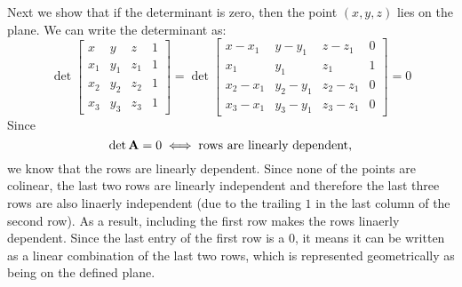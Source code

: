 \begin{sol}
    Next we show that if the determinant is zero, then the point $(x,y,z)$ lies on the plane. We can write the determinant as:
    \begin{equation}
        \det \begin{bmatrix}
            x & y & z & 1 \\ 
            x_1 & y_1 & z_1 & 1 \\ 
            x_2 & y_2 & z_2 & 1 \\ 
            x_3 & y_3 & z_3 & 1 
        \end{bmatrix}
        = 
        \det \begin{bmatrix}
            x-x_1 & y-y_1 & z-z_1 & 0 \\ 
            x_1 & y_1 & z_1 & 1 \\ 
            x_2-x_1 & y_2-y_1 & z_2-z_1 & 0 \\ 
            x_3-x_1 & y_3-y_1 & z_3-z_1 & 0
        \end{bmatrix} = 0
    \end{equation}
    Since $$\det \mathbf{A} = 0 \iff \text{rows are linearly dependent},$$ we know that the rows are linearly dependent. Since none of the points are colinear, the last two rows are linearly independent and therefore the last three rows are also linaerly independent (due to the trailing $1$ in the last column of the second row). As a result, including the first row makes the rows linaerly dependent. Since the last entry of the first row is a $0$, it means it can be written as a linear combination of the last two rows, which is represented geometrically as being on the defined plane.
\end{sol}